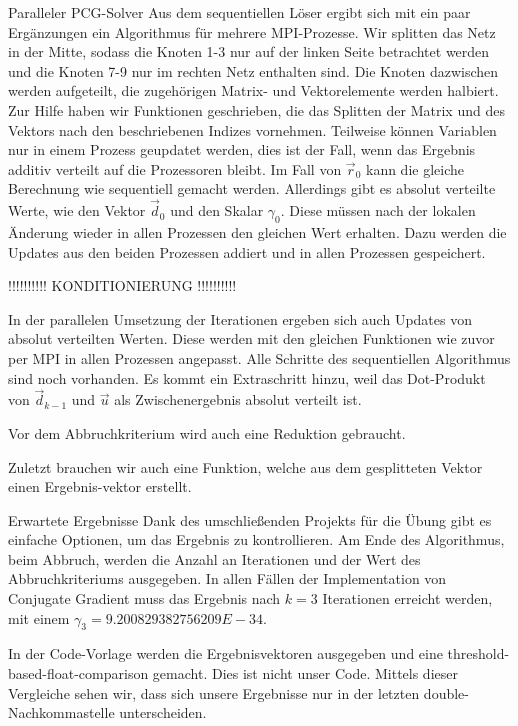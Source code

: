 \documentclass[
ngerman,
subtask=ruled %
]{tudaexercise}
\begin{document}
	\begin{task}{Paralleler PCG-Solver}
		Aus dem sequentiellen Löser ergibt sich mit ein paar Ergänzungen ein Algorithmus für mehrere MPI-Prozesse.
		Wir splitten das Netz in der Mitte, sodass die Knoten 1-3 nur auf der linken Seite betrachtet werden und die Knoten 7-9 nur im rechten Netz enthalten sind. Die Knoten dazwischen werden aufgeteilt, die zugehörigen Matrix- und Vektorelemente werden halbiert.
		Zur Hilfe haben wir Funktionen geschrieben, die das Splitten der Matrix und des Vektors nach den beschriebenen Indizes vornehmen. Teilweise können Variablen nur in einem Prozess geupdatet werden, dies ist der Fall, wenn das Ergebnis additiv verteilt auf die Prozessoren bleibt. Im Fall von $\vec{r}_0$ kann die gleiche Berechnung wie sequentiell gemacht werden.
		Allerdings gibt es absolut verteilte Werte, wie den Vektor $\vec{d}_0$ und den Skalar $\gamma_0$. Diese müssen nach der lokalen Änderung wieder in allen Prozessen den gleichen Wert erhalten. Dazu werden die Updates aus den beiden Prozessen addiert und in allen Prozessen gespeichert.
		
		!!!!!!!!!! KONDITIONIERUNG !!!!!!!!!!
		
		In der parallelen Umsetzung der Iterationen ergeben sich auch Updates von absolut verteilten Werten. Diese werden mit den gleichen Funktionen wie zuvor per MPI in allen Prozessen angepasst. Alle Schritte des sequentiellen Algorithmus sind noch vorhanden. Es kommt ein Extraschritt hinzu, weil das Dot-Produkt von $\vec{d}_{k-1}$ und $\vec{u}$ als Zwischenergebnis absolut verteilt ist.
		
		Vor dem Abbruchkriterium wird auch eine Reduktion gebraucht.\textit{}
		
		Zuletzt brauchen wir auch eine Funktion, welche aus dem gesplitteten Vektor einen Ergebnis-vektor erstellt.
	\end{task}	

	\begin{task}{Erwartete Ergebnisse}
		Dank des umschließenden Projekts für die Übung gibt es einfache Optionen, um das Ergebnis zu kontrollieren.
		Am Ende des Algorithmus, beim Abbruch, werden die Anzahl an Iterationen und der Wert des Abbruchkriteriums ausgegeben.
		In allen Fällen der Implementation von Conjugate Gradient muss das Ergebnis nach $k = 3$ Iterationen erreicht werden, mit einem $\gamma_3 = 9.200829382756209 E -34$.
		
		In der Code-Vorlage werden die Ergebnisvektoren ausgegeben und eine threshold-based-float-comparison gemacht. Dies ist nicht unser Code. Mittels dieser Vergleiche sehen wir, dass sich unsere Ergebnisse nur in der letzten double-Nachkommastelle unterscheiden.
	\end{task}	
\end{document}

